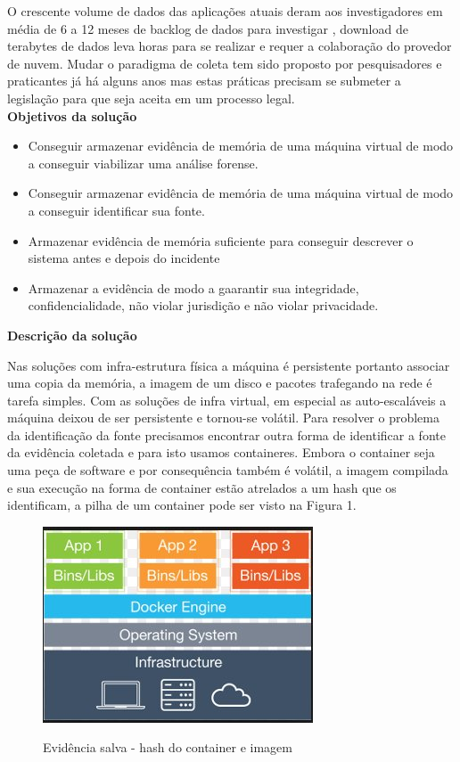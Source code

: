 \documentclass[
	12pt,				%
	openright,			%
	oneside,			%
	a4paper,			%
	english,			%
	french,				%
	spanish,			%
	brazil,				%
	]{abntex2}
\begin{document}
O crescente volume de dados das aplicações atuais deram aos investigadores em média de 6 a 12 meses de backlog de dados para investigar \cite{Quick2014}, download de terabytes
de dados leva horas para se realizar e requer a colaboração do provedor de nuvem. Mudar o paradigma de coleta tem sido proposto por pesquisadores e praticantes já há alguns
anos \cite{Birk2011}\cite{Sang2013} mas estas práticas precisam se submeter a legislação para que seja aceita em um processo legal.\\

\textbf{Objetivos da solução}

\begin{itemize}
 \item Conseguir armazenar evidência de memória de uma máquina virtual de modo a conseguir viabilizar uma análise forense.
 \item Conseguir armazenar evidência de memória de uma máquina virtual de modo a conseguir identificar sua fonte.
 \item Armazenar evidência de memória suficiente para conseguir descrever o sistema antes e depois do incidente
 \item Armazenar a evidência de modo a gaarantir sua integridade, confidencialidade, não violar jurisdição e não violar privacidade.\\
\end{itemize}

\textbf{Descrição da solução}

Nas soluções com infra-estrutura física a máquina é persistente portanto associar uma copia da memória, a imagem de um disco e pacotes trafegando na rede é tarefa simples.
Com as soluções de infra virtual, em especial as auto-escaláveis a máquina deixou de ser persistente e tornou-se volátil. Para resolver o problema da identificação da fonte
precisamos encontrar outra forma de identificar a fonte da evidência coletada e para isto usamos containeres. Embora o container seja uma peça de software e por consequência
também é volátil, a imagem compilada e sua execução na forma de container estão atrelados a um hash que os identificam, a pilha de um container pode ser visto na Figura 1. 

\begin{figure}[h]
\caption{Evidência salva - hash do container e imagem}
\includegraphics[scale=0.5]{docker.jpg}
\centering
\label{fig:instantaneo}
\end{figure}
\end{document}

